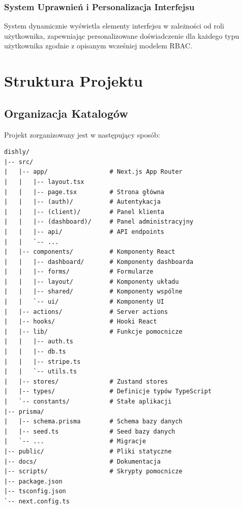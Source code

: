 ﻿\documentclass[12pt,a4paper,utf-8]{article}
\begin{document}
\subsubsection{System Uprawnień i Personalizacja Interfejsu}

System dynamicznie wyświetla elementy interfejsu w zależności od roli użytkownika, zapewniając personalizowane doświadczenie dla każdego typu użytkownika zgodnie z opisanym wcześniej modelem RBAC.

\newpage

\newpage

\section{Struktura Projektu}

\subsection{Organizacja Katalogów}

Projekt zorganizowany jest w następujący sposób:

\begin{verbatim}
dishly/
|-- src/
|   |-- app/                 # Next.js App Router
|   |   |-- layout.tsx
|   |   |-- page.tsx         # Strona główna
|   |   |-- (auth)/          # Autentykacja
|   |   |-- (client)/        # Panel klienta
|   |   |-- (dashboard)/     # Panel administracyjny
|   |   |-- api/             # API endpoints
|   |   `-- ...
|   |-- components/          # Komponenty React
|   |   |-- dashboard/       # Komponenty dashboarda
|   |   |-- forms/           # Formularze
|   |   |-- layout/          # Komponenty układu
|   |   |-- shared/          # Komponenty wspólne
|   |   `-- ui/              # Komponenty UI
|   |-- actions/             # Server actions
|   |-- hooks/               # Hooki React
|   |-- lib/                 # Funkcje pomocnicze
|   |   |-- auth.ts
|   |   |-- db.ts
|   |   |-- stripe.ts
|   |   `-- utils.ts
|   |-- stores/              # Zustand stores
|   |-- types/               # Definicje typów TypeScript
|   `-- constants/           # Stałe aplikacji
|-- prisma/
|   |-- schema.prisma        # Schema bazy danych
|   |-- seed.ts              # Seed bazy danych
|   `-- ...                  # Migracje
|-- public/                  # Pliki statyczne
|-- docs/                    # Dokumentacja
|-- scripts/                 # Skrypty pomocnicze
|-- package.json
|-- tsconfig.json
`-- next.config.ts
\end{verbatim}
\end{document}
